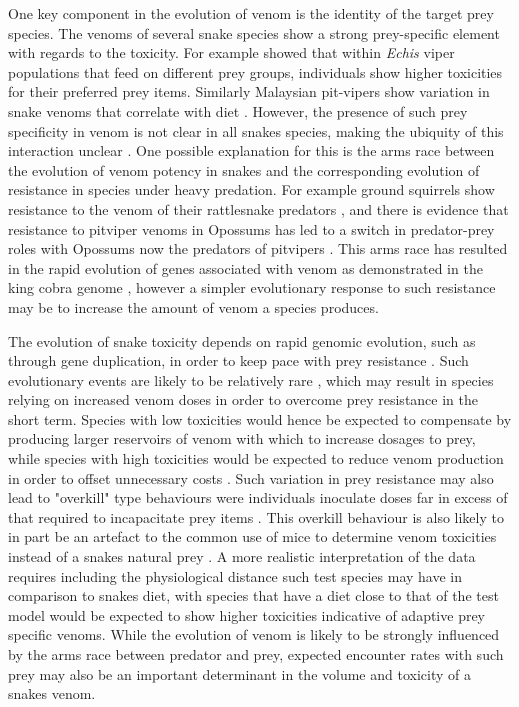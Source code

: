 One key component in the evolution of venom is the identity of the target prey species. The venoms of several snake species show a strong prey-specific element with regards to the toxicity. For example \cite{barlow2009coevolution} showed that within \textit{Echis} viper populations that feed on different prey groups, individuals show higher toxicities for their preferred prey items. Similarly Malaysian pit-vipers show variation in snake venoms that correlate with diet \citep{daltry1996diet}. However, the presence of such prey specificity in venom is not clear in all snakes species, making the ubiquity of this interaction unclear \citep{williams1988variation}. One possible explanation for this is the arms race between the evolution of venom potency in snakes and the corresponding evolution of resistance in species under heavy predation. For example ground squirrels show resistance to the venom of their rattlesnake predators \citep{poran1987resistance}, and there is evidence that resistance to pitviper venoms in Opossums has led to a switch in predator-prey roles with Opossums now the predators of pitvipers \citep{voss2013opossums}. This arms race has resulted in the rapid evolution of genes associated with venom as demonstrated in the king cobra genome \citep{vonk2013king}, however a simpler evolutionary response to such resistance may be to increase the amount of venom a species produces.


The evolution of snake toxicity depends on rapid genomic evolution, such as through gene duplication, in order to keep pace with prey resistance \citep{vonk2013king}. Such evolutionary events are likely to be relatively rare \citep{vonk2013king}, which may result in species relying on increased venom doses in order to overcome prey resistance in the short term. Species with low toxicities would hence be expected to compensate by producing larger reservoirs of venom with which to increase dosages to prey, while species with high toxicities would be expected to reduce venom production in order to offset unnecessary costs \citep{mccue2006cost}. Such variation in prey resistance may also lead to "overkill" type behaviours were individuals inoculate doses far in excess of that required to incapacitate prey items \citep{sasa1999diet,mebs2001toxicity}. This overkill behaviour is also likely to in part be an artefact to the common use of mice to determine venom toxicities instead of a snakes natural prey \citep{da2001prey}. A more realistic interpretation of the data requires including the physiological distance such test species may have in comparison to snakes diet, with species that have a diet close to that of the test model would be expected to show higher toxicities indicative of adaptive prey specific venoms. While the evolution of venom is likely to be strongly influenced by the arms race between predator and prey, expected encounter rates with such prey may also be an important determinant in the volume and toxicity of a snakes venom.


